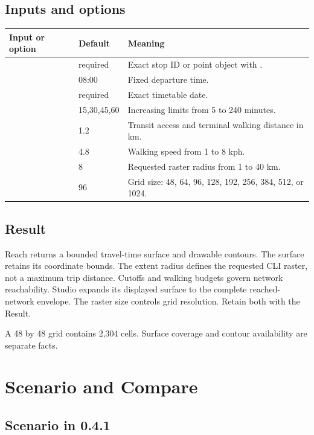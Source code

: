 \documentclass[10pt,letterpaper]{article}
\begin{document}
\subsection{Inputs and options}

\begin{longtable}{P{1.62in} P{1.08in} P{3.60in}}
\toprule
\textbf{Input or option} & \textbf{Default} & \textbf{Meaning} \\
\midrule
\endhead
{} & required & Exact stop ID or point object with . \\
 & 08:00 & Fixed departure time. \\
 & required & Exact timetable date. \\
 & 15,30,45,60 & Increasing limits from 5 to 240 minutes. \\
 & 1.2 & Transit access and terminal walking distance in km. \\
 & 4.8 & Walking speed from 1 to 8 kph. \\
 & 8 & Requested raster radius from 1 to 40 km. \\
 & 96 & Grid size: 48, 64, 96, 128, 192, 256, 384, 512, or 1024. \\
\bottomrule
\end{longtable}

\subsection{Result}

Reach returns a bounded travel-time surface and drawable contours. The surface retains its coordinate bounds. The extent radius defines the requested CLI raster, not a maximum trip distance. Cutoffs and walking budgets govern network reachability. Studio expands its displayed surface to the complete reached-network envelope. The raster size controls grid resolution. Retain both with the Result.

A 48 by 48 grid contains 2,304 cells. Surface coverage and contour availability are separate facts.

\section{Scenario and Compare}

\subsection{Scenario in 0.4.1}
\end{document}
